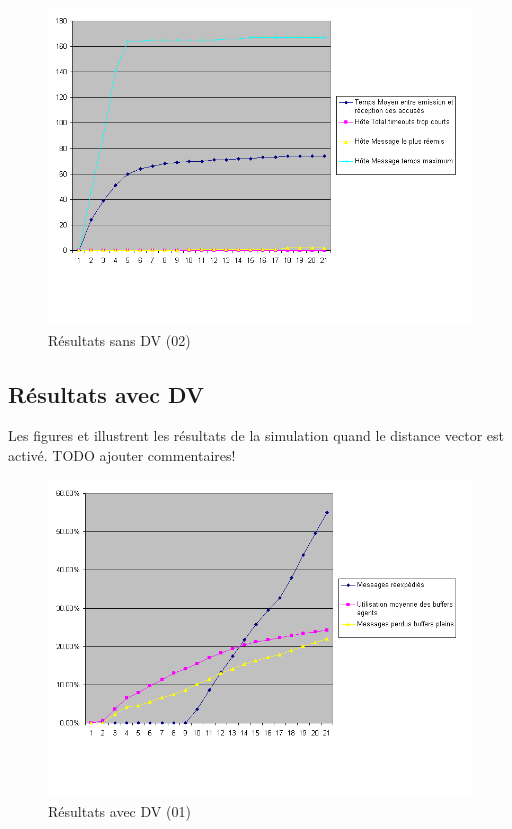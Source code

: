 \documentclass[a4paper,11pt]{article}
\begin{document}
\begin{figure}[h!t]
  \centering
    \includegraphics[scale=0.55]{sansdv2}
  \caption{Résultats sans DV (02)}
  \label{fig:sansdv02}
\end{figure}


\subsection{Résultats avec DV}
Les figures  et  illustrent les résultats de la simulation quand le distance vector est activé.
TODO ajouter commentaires!
\begin{figure}[h!t]
  \centering
    \includegraphics[scale=0.55]{avecdv1}
  \caption{Résultats avec DV (01)}
  \label{fig:avecdv01}
\end{figure}
\end{document}
